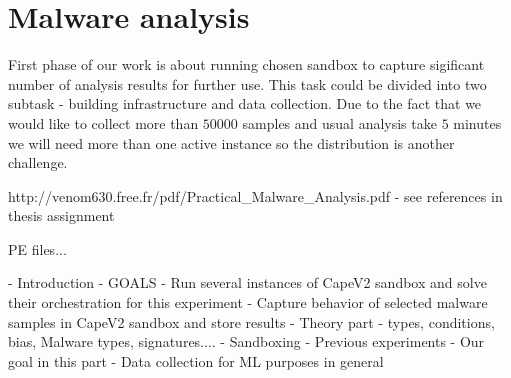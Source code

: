 \chapter{Malware analysis}
First phase of our work is about running chosen sandbox to capture sigificant number of analysis results for further use. This task could be divided into two subtask - building infrastructure and data collection. Due to the fact that we would like to collect more than $50 000$ samples and usual analysis take $5$ minutes we will need more than one active instance so the distribution is another challenge.

http://venom630.free.fr/pdf/Practical_Malware_Analysis.pdf
- see references in thesis assignment

PE files...


- Introduction
- GOALS
  - Run several instances of CapeV2 sandbox and solve their orchestration for this experiment
  - Capture behavior of selected malware samples in CapeV2 sandbox and store results
- Theory part - types, conditions, bias, Malware types, signatures....
- Sandboxing
- Previous experiments
- Our goal in this part
- Data collection for ML purposes in general